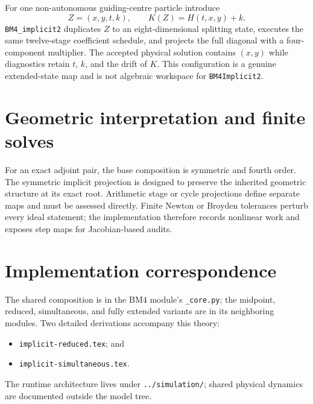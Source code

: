 \documentclass[11pt,a4paper]{article}
\begin{document}
For one non-autonomous guiding-centre particle introduce
\[
Z=(x,y,t,k),\qquad K(Z)=H(t,x,y)+k.
\]
\texttt{BM4\_implicit2} duplicates $Z$ to an eight-dimensional splitting
state, executes the same twelve-stage coefficient schedule, and projects the
full diagonal with a four-component multiplier.  The accepted physical
solution contains $(x,y)$ while diagnostics retain $t$, $k$, and the drift of
$K$.  This configuration is a genuine extended-state map and is not algebraic
workspace for \texttt{BM4Implicit2}.

\section{Geometric interpretation and finite solves}

For an exact adjoint pair, the base composition is symmetric and fourth order.
The symmetric implicit projection is designed to preserve the inherited
geometric structure at its exact root.  Arithmetic stage or cycle projections
define separate maps and must be assessed directly.  Finite Newton or Broyden
tolerances perturb every ideal statement; the implementation therefore records
nonlinear work and exposes step maps for Jacobian-based audits.

\section{Implementation correspondence}

The shared composition is in the BM4 module's \texttt{\_core.py}; the midpoint,
reduced, simultaneous, and fully extended variants are in its neighboring
modules.  Two detailed derivations accompany this theory:
\begin{itemize}
\item \texttt{implicit-reduced.tex}; and
\item \texttt{implicit-simultaneous.tex}.
\end{itemize}
The runtime architecture lives under \texttt{../simulation/}; shared physical
dynamics are documented outside the model tree.
\end{document}
